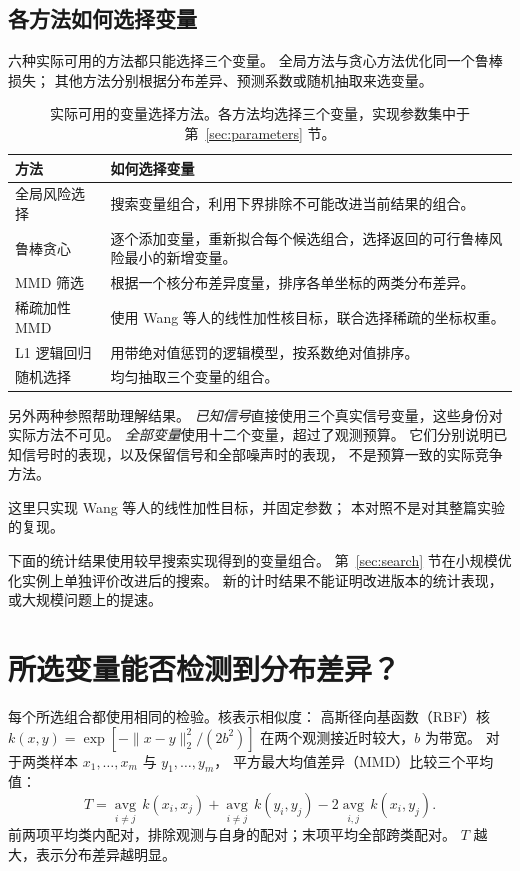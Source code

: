 \documentclass[11pt,a4paper]{article}
\begin{document}
\subsection{各方法如何选择变量}
六种实际可用的方法都只能选择三个变量。
全局方法与贪心方法优化同一个鲁棒损失；
其他方法分别根据分布差异、预测系数或随机抽取来选变量。
\begin{table}[htbp]\centering\small
\caption{实际可用的变量选择方法。各方法均选择三个变量，实现参数集中于第~\ref{sec:parameters} 节。}\label{tab:selectors}
\begin{tabularx}{\linewidth}{@{}p{32mm}Y@{}}\toprule
方法 & 如何选择变量\\\midrule
全局风险选择 & 搜索变量组合，利用下界排除不可能改进当前结果的组合。\\
鲁棒贪心 & 逐个添加变量，重新拟合每个候选组合，选择返回的可行鲁棒风险最小的新增变量。\\
MMD 筛选 & 根据一个核分布差异度量，排序各单坐标的两类分布差异。\\
稀疏加性 MMD & 使用 Wang 等人的线性加性核目标，联合选择稀疏的坐标权重。\\
L1 逻辑回归 & 用带绝对值惩罚的逻辑模型，按系数绝对值排序。\\
随机选择 & 均匀抽取三个变量的组合。\\\bottomrule
\end{tabularx}\end{table}
\FloatBarrier

另外两种参照帮助理解结果。
\emph{已知信号}直接使用三个真实信号变量，这些身份对实际方法不可见。
\emph{全部变量}使用十二个变量，超过了观测预算。
它们分别说明已知信号时的表现，以及保留信号和全部噪声时的表现，
不是预算一致的实际竞争方法。

这里只实现 Wang 等人的线性加性目标，并固定参数；
本对照不是对其整篇实验的复现。

下面的统计结果使用较早搜索实现得到的变量组合。
第~\ref{sec:search} 节在小规模优化实例上单独评价改进后的搜索。
新的计时结果不能证明改进版本的统计表现，或大规模问题上的提速。

\FloatBarrier
\section{所选变量能否检测到分布差异？}\label{sec:statistics}
每个所选组合都使用相同的检验。核表示相似度：
高斯径向基函数（RBF）核
$k(x,y)=\exp[-\|x-y\|_2^2/(2b^2)]$ 在两个观测接近时较大，$b$ 为带宽。
对于两类样本 $x_1,\ldots,x_m$ 与 $y_1,\ldots,y_m$，
平方最大均值差异（MMD）比较三个平均值：
\[
T=\underset{i\ne j}{\operatorname{avg}}\,k(x_i,x_j)
 +\underset{i\ne j}{\operatorname{avg}}\,k(y_i,y_j)
 -2\underset{i,j}{\operatorname{avg}}\,k(x_i,y_j).
\]
前两项平均类内配对，排除观测与自身的配对；末项平均全部跨类配对。
$T$ 越大，表示分布差异越明显。
\end{document}
